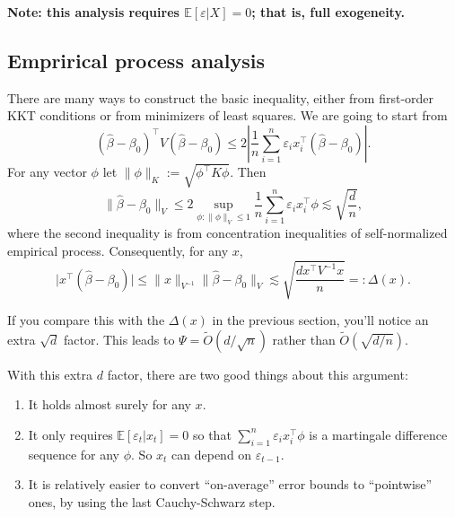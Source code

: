 \documentclass[11pt,a4paper]{article}
\renewcommand{\hat}{\widehat}
\renewcommand{\tilde}{\widetilde}
\theoremstyle{definition}
\theoremstyle{plain}
\theoremstyle{remark}
\begin{document}
\textbf{Note: this analysis requires $\mathbb E[\varepsilon|X]=0$; that is, full exogeneity.}

\subsection{Emprirical process analysis}

There are many ways to construct the basic inequality, either from first-order KKT conditions or from minimizers of least squares.
We are going to start from 
$$
(\hat\beta-\beta_0)^\top V(\hat\beta-\beta_0) \leq 2\left|\frac{1}{n}\sum_{i=1}^n \varepsilon_i x_i^\top(\hat\beta-\beta_0)\right|.
$$
For any vector $\phi$ let $\|\phi\|_K := \sqrt{\phi^\top K\phi}$. Then
$$
\|\hat\beta-\beta_0\|_V \leq 2\sup_{\phi: \|\phi\|_V\leq 1}\frac{1}{n}\sum_{i=1}^n \varepsilon_i x_i^\top\phi \lesssim \sqrt{\frac{d}{n}},
$$
where the second inequality is from concentration inequalities of self-normalized empirical process. Consequently, for any $x$,
$$
\big|x^\top(\hat\beta-\beta_0)\big| \leq \|x\|_{V^{-1}}\|\hat\beta-\beta_0\|_{V} \lesssim \sqrt{\frac{dx^\top V^{-1}x}{n}} =: \Delta(x).
$$

If you compare this with the $\Delta(x)$ in the previous section, you'll notice an extra $\sqrt{d}$ factor.
This leads to $\Psi=\tilde O(d/\sqrt{n})$ rather than $\tilde O(\sqrt{d/n})$.

With this extra $d$ factor, there are two good things about this argument:
\begin{enumerate}
\item It holds almost surely for any $x$.
\item It only requires $\mathbb E[\varepsilon_t|x_t]=0$ so that $\sum_{i=1}^n\varepsilon_i x_i^\top\phi$ is a martingale difference sequence for any $\phi$. So $x_t$ can depend on $\varepsilon_{t-1}$.
\item It is relatively easier to convert ``on-average'' error bounds to ``pointwise'' ones, by using the last Cauchy-Schwarz step.
\end{enumerate}



\end{document}
